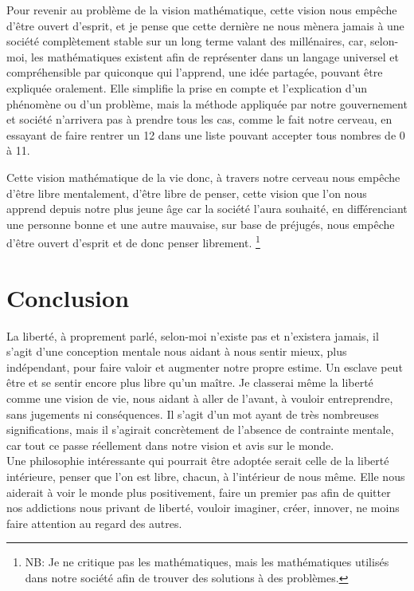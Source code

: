 \documentclass[twocolumn, french]{article}
\begin{document}
Pour revenir au problème de la vision mathématique, cette 
vision nous empêche d'être ouvert d'esprit, et je pense que cette dernière ne nous mènera jamais
à une société complètement stable sur un long terme valant des millénaires, car, selon-moi, les 
mathématiques existent afin de représenter dans un langage universel et compréhensible par quiconque 
qui l'apprend, une idée partagée, pouvant être expliquée oralement. Elle simplifie la prise en compte 
et l'explication d'un phénomène ou d'un problème, mais la méthode appliquée par notre gouvernement 
et société n'arrivera pas à prendre tous les cas, comme le fait notre cerveau, en essayant de faire 
rentrer un 12 dans une liste pouvant accepter tous nombres de 0 à 11. 

Cette vision mathématique de la vie donc, à travers notre cerveau nous empêche d'être libre 
mentalement, d'être libre de penser, cette vision que l'on nous apprend depuis notre plus 
jeune âge car la société l'aura souhaité, en différenciant une personne bonne et une autre
mauvaise, sur base de préjugés, nous empêche d'être ouvert d'esprit et de donc penser 
librement.
\footnote{ 
  NB: Je ne critique pas les mathématiques, mais les mathématiques utilisés dans notre société
  afin de trouver des solutions à des problèmes.
}

\section*{Conclusion}
La liberté, à proprement parlé, selon-moi n'existe pas et n'existera jamais, il s'agit d'une 
conception mentale nous aidant à nous sentir mieux, plus indépendant, pour faire valoir et augmenter 
notre propre estime. Un esclave peut être et se sentir encore plus libre qu'un maître. Je classerai
même la liberté comme une vision de vie, nous aidant à aller de l'avant, à vouloir entreprendre,
sans jugements ni conséquences. Il s'agit d'un mot ayant de très nombreuses significations, mais
il s'agirait concrètement de l'absence de contrainte mentale, car tout ce passe réellement dans 
notre vision et avis sur le monde. \\ Une philosophie intéressante qui pourrait être adoptée 
serait celle de la liberté intérieure, penser que l'on est libre, chacun, à l'intérieur de nous 
même. Elle nous aiderait à voir le monde plus positivement, faire un premier pas afin de quitter
nos addictions nous privant de liberté, vouloir imaginer, créer, innover, ne moins faire attention
au regard des autres.
\end{document}
